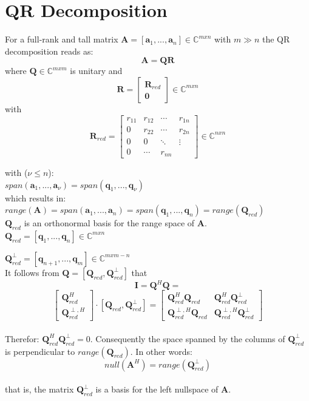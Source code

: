 \documentclass[english]{latex4ei/latex4ei_sheet}
\begin{document}
\section{QR Decomposition}
\begin{sectionbox}
For a full-rank and tall matrix $\mathbf{A} = [\mathbf{a}_1, ...,\mathbf{a}_n] \in \mathbb{C}^{mxn}$ with $m\gg n$ the QR decomposition reads as:
$$\mathbf{A} = \mathbf{Q}\mathbf{R}$$
where $\mathbf{Q}\in\mathbb{C}^{mxm}$ is unitary and
$$\mathbf{R}=\begin{bmatrix}
\mathbf{R}_{red}\\
\mathbf{0}
\end{bmatrix} \in \mathbb{C}^{mxn}$$
with
$$\mathbf{R}_{red} = \begin{bmatrix}
r_{11} & r_{12} & \cdots & r_{1n}\\
0 & r_{22} & \cdots & r_{2n}\\
0 & 0 & \ddots & \vdots \\
0 & \cdots & r_{nn}
\end{bmatrix} \in \mathbb{C}^{nxn}$$

with ($\nu \leq n$):\\
$span(\mathbf{a}_1, ...,\mathbf{a}_\nu) = span(\mathbf{q}_1, ...,\mathbf{q}_\nu)$\\
which results in:\\
$range(\mathbf{A}) = span(\mathbf{a}_1, ...,\mathbf{a}_n) = span(\mathbf{q}_1, ...,\mathbf{q}_n) = range(\mathbf{Q}_{red})$\\
$\mathbf{Q}_{red}$ is an orthonormal basis for the range space of $\mathbf{A}$. \\

$\mathbf{Q}_{red} = [\mathbf{q}_1, ...,\mathbf{q}_n]\in \mathbb{C}^{mxn}$

$\mathbf{Q}^\perp_{red} = [\mathbf{q}_{n+1}, ... ,\mathbf{q}_m] \in \mathbb{C}^{mxm-n}$\\
It follows from 
$\mathbf{Q} = [\mathbf{Q}_{red},\mathbf{Q}_{red}^\perp]$ that\\
$$\mathbf{I} = \mathbf{Q}^H\mathbf{Q} = $$
$$\begin{bmatrix}
	\mathbf{Q}_{red}^H\\
	\mathbf{Q}_{red}^{\perp,H}
\end{bmatrix} \cdot [\mathbf{Q}_{red}, \mathbf{Q}_{red}^\perp] = \begin{bmatrix}
\mathbf{Q}_{red}^H\mathbf{Q}_{red} & \mathbf{Q}_{red}^H\mathbf{Q}_{red}^\perp \\
\mathbf{Q}_{red}^{\perp,H}\mathbf{Q}_{red} & \mathbf{Q}_{red}^{\perp,H}\mathbf{Q}_{red}^\perp
\end{bmatrix}$$\\

Therefor: $\mathbf{Q}_{red}^H\mathbf{Q}_{red}^\perp = 0$. Consequently the space spanned by the columns of $\mathbf{Q}_{red}^\perp$ is perpendicular to $range(\mathbf{Q}_{red})$. In other words:
$$null(\mathbf{A}^H) = range(\mathbf{Q}_{red}^\perp)$$\\
that is, the matrix $\mathbf{Q}_{red}^\perp$ is a basis for the left nullspace of $\mathbf{A}$.

\end{sectionbox}
\end{document}
